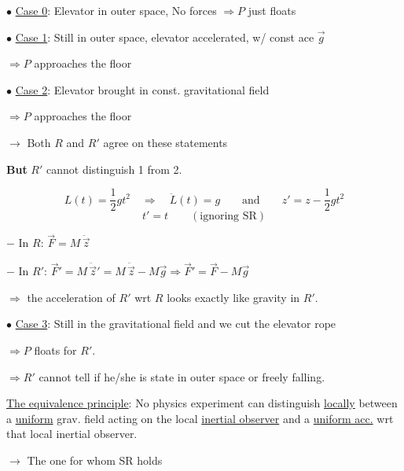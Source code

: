 \documentclass[a4paper,12pt]{article}
\begin{document}
$\bullet$ \uline{Case 0}: Elevator in outer space, No forces $\Longrightarrow P$ just floats

$\bullet$ \uline{Case 1}: Still in outer space, elevator accelerated, w/ const ace $\vec g$

\hspace{1.5em}$\Longrightarrow P$ approaches the floor

$\bullet$ \uline{Case 2}: Elevator brought in const. gravitational field

\hspace{1.5em}$\Longrightarrow P$ approaches the floor

$\longrightarrow$ Both $R$ and $R'$ agree on these statements

\textbf{But} $R'$ cannot distinguish 1 from 2.

\begin{center}
\end{center}

\[
  L(t)=\frac{1}{2}gt^2\quad\Longrightarrow\quad \ddot L(t)=g
  \qquad\text{and}\qquad z'=z-\frac{1}{2}gt^2
\]
\[
  t'=t\qquad(\text{ignoring SR})
\]

$-$ In $R$: \qquad $\vec F=M\,\ddot{\vec z}$

$-$ In $R'$: \qquad $\vec F'=M\,\ddot{\vec z}'=M\,\ddot{\vec z}-M\vec g\Longrightarrow \vec F'=\vec F-M\vec g$

$\Longrightarrow$ the acceleration of $R'$ wrt $R$ looks exactly like gravity in $R'$.

$\bullet$ \uline{Case 3}: Still in the gravitational field and we cut the elevator rope

$\Longrightarrow P$ floats for $R'$.

$\Longrightarrow R'$ cannot tell if he/she is state in outer space or freely falling.

\uline{The equivalence principle}: No physics experiment can distinguish \uline{locally} between a \uline{uniform} grav. field acting on the local \uline{inertial observer} and a \uline{uniform acc.} wrt that local inertial observer.

\hspace{3em}$\longrightarrow$ The one for whom SR holds
\end{document}
